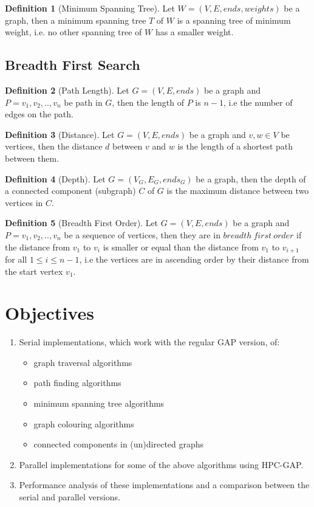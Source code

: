 \documentclass{report}
\theoremstyle{plain}
\theoremstyle{definition}
\newtheorem{definition}{Definition}
\theoremstyle{remark}
\begin{document}
\begin{definition}[Minimum Spanning Tree]
Let $W = (V, E, ends, weights)$ be a graph, then a minimum spanning tree $T$ of $W$ is a spanning tree of minimum weight, i.e. no other spanning tree of $W$ has a smaller weight.
\end{definition}

\section*{Breadth First Search}

\begin{definition}[Path Length]
Let $G = (V, E, ends)$ be a graph and $P=v_1,v_2,..,v_n$ be path in $G$, then the length of $P$ is $n-1$, i.e the number of edges on the path. 
\end{definition}

\begin{definition}[Distance]
Let $G = (V, E, ends)$ be a graph and $v, w \in V$ be vertices, then the distance $d$ between $v$ and $w$ is the length of a shortest path between them. 
\end{definition}

\begin{definition}[Depth]
Let $G = (V_G, E_G, ends_G)$ be a graph, then the depth of a connected component (subgraph) $C$ of $G$ is the maximum distance between two vertices in $C$.
\end{definition}

\begin{definition}[Breadth First Order]
Let $G = (V, E, ends)$ be a graph and $P=v_1,v_2,..,v_n$ be a sequence of vertices, then they are in $breadth \ first \ order$ if the distance from $v_1$ to $v_i$ is smaller or equal than the distance from $v_1$ to $v_{i+1}$ for all $1 \leq i \leq n - 1$, i.e the vertices are in ascending order by their distance from the start vertex $v_1$.
\end{definition}

\chapter{Objectives}
\begin{enumerate}
  \item Serial implementations, which work with the regular GAP version, of:
  \begin{itemize}
    \item graph traversal algorithms
    \item path finding algorithms
    \item minimum spanning tree algorithms
    \item graph colouring algorithms
    	\item connected components in (un)directed graphs
  \end{itemize}
  \item Parallel implementations for some of the above algorithms using HPC-GAP.
  \item Performance analysis of these implementations and a comparison between the serial and parallel versions.
\end{enumerate}
\end{document}

